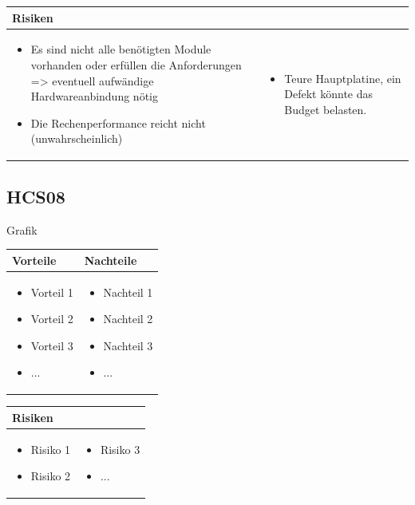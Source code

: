 \begin{table}[h]
\begin{tabular}{p{}p{}}


 \textbf{Risiken} & \\ \hline
	 
\begin{itemize}
\item Es sind nicht alle benötigten Module vorhanden oder erfüllen die Anforderungen => eventuell aufwändige Hardwareanbindung nötig
\item Die Rechenperformance reicht nicht (unwahrscheinlich)
\end{itemize}
&
\begin{itemize}
\item Teure Hauptplatine, ein Defekt könnte das Budget belasten.
\end{itemize}

 
\end{tabular}
\end{table}

\pagebreak

\subsection{HCS08}
Grafik

\begin{table}[h]
\begin{tabular}{p{} | p{}}


 \textbf{Vorteile} & \textbf{Nachteile} \\ \hline
	 
\begin{itemize}
\item Vorteil 1
\item Vorteil 2
\item Vorteil 3
\item ...
\end{itemize}

 
 &
 
\begin{itemize}
\item Nachteil 1
\item Nachteil 2
\item Nachteil 3
\item ...
\end{itemize}

\end{tabular}
\end{table}

\begin{table}[h]
\begin{tabular}{p{}p{}}


 \textbf{Risiken} & \\ \hline
	 
\begin{itemize}
\item Risiko 1
\item Risiko 2
\end{itemize}
&
\begin{itemize}
\item Risiko 3
\item ...
\end{itemize}

 
\end{tabular}
\end{table}

\pagebreak